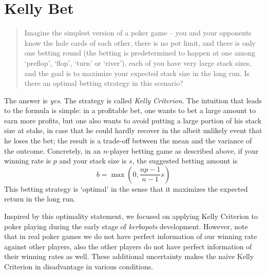 \documentclass[11pt, oneside]{article}   	%
\begin{document}
\section{Kelly Bet}
\begin{quote}
	Imagine the simplest version of a poker game -- you and your opponents know the hole cards of each other, there is no pot limit, and there is only one betting round (the betting is predetermined to happen at one among `preflop', `flop', `turn' or `river'), each of you have very large stack sizes, and the goal is to maximize your expected stack size in the long run. Is there an optimal betting strategy in this scenario?
\end{quote}
The answer is \emph{yes}. The strategy is called \emph{Kelly Criterion}. The intuition that leads to the formula is simple: in a profitable bet, one wants to bet a large amount to earn more profits, but one also wants to avoid putting a large portion of his stack size at stake, in case that he could hardly recover in the albeit unlikely event that he loses the bet; the result is a trade-off between the mean and the variance of the outcome. Concretely, in an $n$-player betting game as described above, if your winning rate is $p$ and your stack size is $s$, the suggested betting amount is 
	\[b = \max\left(0, \frac{np-1}{n-1} s\right)\]
This betting strategy is `optimal' in the sense that it maximizes the expected return in the long run.

Inspired by this optimality statement, we focused on applying Kelly Criterion to poker playing during the early stage of \emph{kerbopots} development. However, note that in real poker games we do not have perfect information of our winning rate against other players, also the other players do not have perfect information of their winning rates as well. These additional uncertainty makes the na\"ive Kelly Criterion in disadvantage in various conditions.
\end{document}
